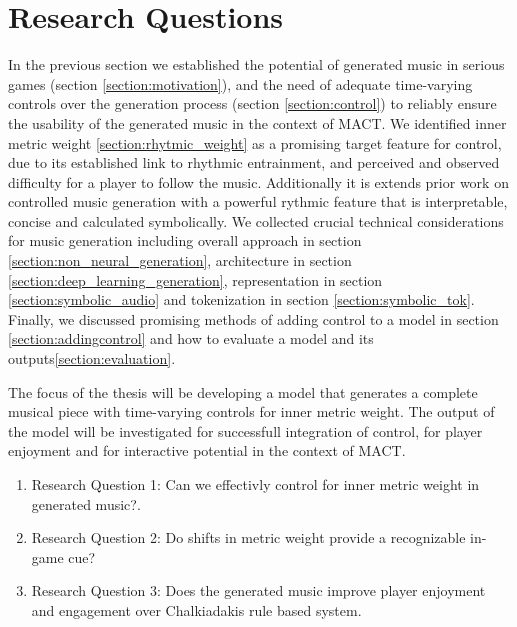 

\chapter{Research Questions}
\label{chap:researchquestions}
\pagestyle{fancy}

In the previous section we established the potential of generated music in serious games (section \ref{section:motivation}), and the need of adequate time-varying controls over the generation process (section \ref{section:control}) to reliably ensure the usability of the generated music in the context of MACT. We identified inner metric weight \ref{section:rhytmic_weight} as a promising target feature for control, due to its established link to rhythmic entrainment, and perceived and observed difficulty for a player to follow the music. Additionally it is extends prior work on controlled music generation with a powerful rythmic feature that is interpretable, concise and calculated symbolically. 
We collected crucial technical considerations for music generation including overall approach in section \ref{section:non_neural_generation}, architecture in section \ref{section:deep_learning_generation}, representation in section \ref{section:symbolic_audio} and tokenization in section \ref{section:symbolic_tok}. Finally, we discussed promising methods of adding control to a model in section \ref{section:addingcontrol} and how to evaluate a model and its outputs\ref{section:evaluation}. 

The focus of the thesis will be developing a model that generates a complete musical piece with time-varying controls for inner metric weight. The output of the model will be investigated for successfull integration of control, for player enjoyment and for interactive potential in the context of MACT. 
  
\begin{enumerate}
\item{Research Question 1}: Can we effectivly control for inner metric weight in generated music?.

\item{Research Question 2}: Do shifts in metric weight provide a recognizable in-game cue?

\item {Research Question 3}: Does the generated music improve player enjoyment and engagement over Chalkiadakis\cite{Chalkiadakis_2022} rule based system. 
\end{enumerate}

